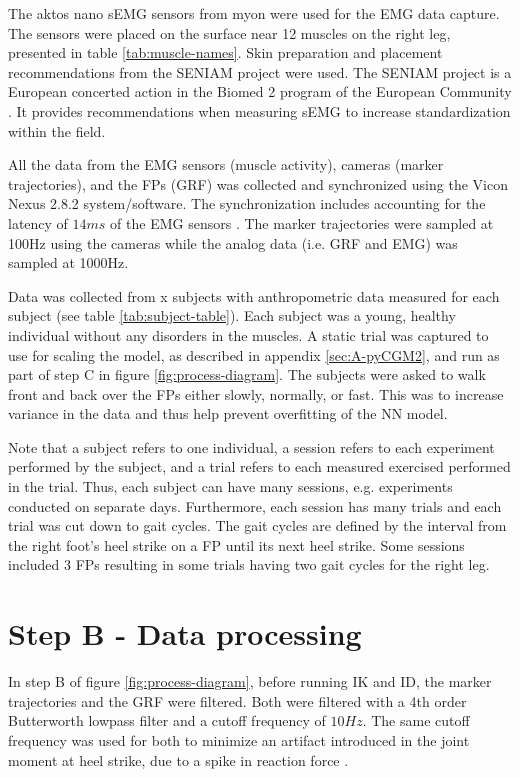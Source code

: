 \documentclass[../main.tex]{subfiles}
\begin{document}

The aktos nano \ac{sEMG} sensors from myon were used for the \ac{EMG} data capture. 
The sensors were placed on the surface near 12 muscles on the right leg, presented in table \ref{tab:muscle-names}. Skin preparation and placement recommendations from the SENIAM project \cite{Stegeman2007, Hermens1999, Hermens2000} were used. The SENIAM project is a European concerted action in the Biomed 2 program of the European Community \cite{Stegeman2007}. It provides recommendations when measuring \ac{sEMG} to increase standardization within the field.

All the data from the \ac{EMG} sensors (muscle activity), cameras (marker trajectories), and the \acp{FP} (\ac{GRF}) was collected and synchronized using the Vicon Nexus 2.8.2 system/software.
The synchronization includes accounting for the latency of $14ms$ of the \ac{EMG} sensors \cite{aktosEMG}.
The marker trajectories were sampled at 100Hz using the cameras while the analog data (i.e. \ac{GRF} and \ac{EMG}) was sampled at 1000Hz.

Data was collected from x subjects with anthropometric data measured for each subject (see table \ref{tab:subject-table}).
Each subject was a young, healthy individual without any disorders in the muscles.
A static trial was captured to use for scaling the model, as described in appendix \ref{sec:A-pyCGM2}, and run as part of step C in figure \ref{fig:process-diagram}.
The subjects were asked to walk front and back over the \acp{FP} either slowly, normally, or fast.
This was to increase variance in the data and thus help prevent overfitting of the \ac{NN} model.


Note that a subject refers to one individual, a session refers to each experiment performed by the subject, and a trial refers to each measured exercised performed in the trial. 
Thus, each subject can have many sessions, e.g. experiments conducted on separate days.
Furthermore, each session has many trials and each trial was cut down to gait cycles. 
The gait cycles are defined by the interval from the right foot's heel strike on a \ac{FP} until its next heel strike.
Some sessions included 3 \acp{FP} resulting in some trials having two gait cycles for the right leg.

\section{Step B - Data processing}
\label{sec:data-processing}
In step B of figure \ref{fig:process-diagram}, before running \ac{IK} and \ac{ID}, the marker trajectories and the \ac{GRF} were filtered.
Both were filtered with a 4th order Butterworth lowpass filter and a cutoff frequency of $10Hz$. 
The same cutoff frequency was used for both to minimize an artifact introduced in the joint moment at heel strike, due to a spike in reaction force \cite{Kristianslund2012}.
\end{document}
